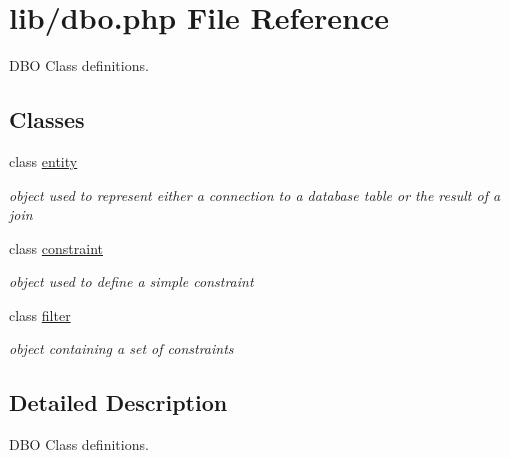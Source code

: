 \hypertarget{dbo_8php}{\section{lib/dbo.php File Reference}
\label{dbo_8php}
}


D\-B\-O Class definitions.  


\subsection*{Classes}
\begin{DoxyCompactItemize}
\item 
class \hyperlink{classentity}{entity}
\begin{DoxyCompactList}\small\item\em object used to represent either a connection to a database table or the result of a join \end{DoxyCompactList}\item 
class \hyperlink{classconstraint}{constraint}
\begin{DoxyCompactList}\small\item\em object used to define a simple constraint \end{DoxyCompactList}\item 
class \hyperlink{classfilter}{filter}
\begin{DoxyCompactList}\small\item\em object containing a set of constraints \end{DoxyCompactList}\end{DoxyCompactItemize}


\subsection{Detailed Description}
D\-B\-O Class definitions. 